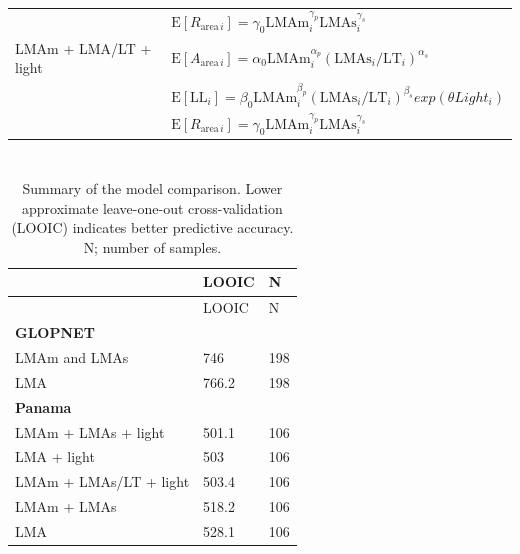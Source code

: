 \documentclass[
  12pt,
]{article}
\begin{document}
\begin{longtable}[]{@{}
  >{\raggedright\arraybackslash}p{}
  >{\raggedright\arraybackslash}p{}@{}}
& \(\mathrm{E}[R_{\mathrm{area} \, i}] = \gamma_0\mathrm{LMAm}_{i}^{\gamma_p} \mathrm{LMAs}_{i}^{\gamma_s}\) \\
LMAm + LMA/LT + light & \(\mathrm{E}[A_{\mathrm{area} \, i}]= \alpha_0\mathrm{LMAm}_{i}^{\alpha_p} (\mathrm{LMAs}_{i}/\mathrm{LT}_{i})^{\alpha_s}\) \\
& \(\mathrm{E}[\mathrm{LL}_i] = \beta_0\mathrm{LMAm}_{i}^{\beta_p} (\mathrm{LMAs}_{i}/\mathrm{LT}_{i})^{\beta_s}exp(\theta Light_i)\) \\
& \(\mathrm{E}[R_{\mathrm{area} \, i}] = \gamma_0\mathrm{LMAm}_{i}^{\gamma_p} \mathrm{LMAs}_{i}^{\gamma_s}\) \\
\bottomrule
\end{longtable}

\newpage

\hypertarget{section}{%
\section{}\label{section}}

\begin{longtable}[]{@{}lll@{}}
\caption{\label{tab:lootab} Summary of the model comparison. Lower approximate leave-one-out cross-validation (LOOIC) indicates better predictive accuracy. N; number of samples.}\tabularnewline
\toprule
& LOOIC & N \\
\midrule
\endfirsthead
\toprule
& LOOIC & N \\
\midrule
\endhead
\textbf{GLOPNET} & & \\
LMAm and LMAs & 746 & 198 \\
LMA & 766.2 & 198 \\
\textbf{Panama} & & \\
LMAm + LMAs + light & 501.1 & 106 \\
LMA + light & 503 & 106 \\
LMAm + LMAs/LT + light & 503.4 & 106 \\
LMAm + LMAs & 518.2 & 106 \\
LMA & 528.1 & 106 \\
\bottomrule
\end{longtable}

\newpage

\hypertarget{section-1}{%
\section{}\label{section-1}}
\end{document}
